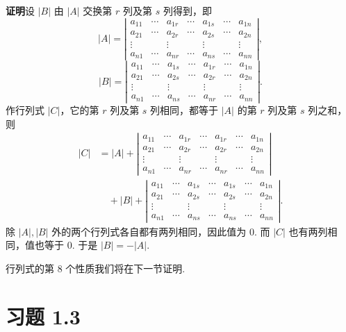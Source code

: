 \documentclass[UTF8,12pt,a4paper,fontset=fandol]{ctexart}
\begin{document}
\noindent\textbf{证明}\quad 设 $|B|$ 由 $|A|$ 交换第 $r$ 列及第 $s$ 列得到，即
\[
|A|=
\left|\begin{array}{ccccccc}
a_{11} & \cdots & a_{1r} & \cdots & a_{1s} & \cdots & a_{1n}\\
a_{21} & \cdots & a_{2r} & \cdots & a_{2s} & \cdots & a_{2n}\\
\vdots & & \vdots & & \vdots & & \vdots\\
a_{n1} & \cdots & a_{nr} & \cdots & a_{ns} & \cdots & a_{nn}
\end{array}\right|,
\]
\[
|B|=
\left|\begin{array}{ccccccc}
a_{11} & \cdots & a_{1s} & \cdots & a_{1r} & \cdots & a_{1n}\\
a_{21} & \cdots & a_{2s} & \cdots & a_{2r} & \cdots & a_{2n}\\
\vdots & & \vdots & & \vdots & & \vdots\\
a_{n1} & \cdots & a_{ns} & \cdots & a_{nr} & \cdots & a_{nn}
\end{array}\right|.
\]
作行列式 $|C|$，它的第 $r$ 列及第 $s$ 列相同，都等于 $|A|$ 的第 $r$ 列及第 $s$ 列之和，则
\[
\begin{aligned}
|C|
&=|A|+
\left|\begin{array}{ccccccc}
a_{11} & \cdots & a_{1r} & \cdots & a_{1r} & \cdots & a_{1n}\\
a_{21} & \cdots & a_{2r} & \cdots & a_{2r} & \cdots & a_{2n}\\
\vdots & & \vdots & & \vdots & & \vdots\\
a_{n1} & \cdots & a_{nr} & \cdots & a_{nr} & \cdots & a_{nn}
\end{array}\right|\\
&\quad+|B|+
\left|\begin{array}{ccccccc}
a_{11} & \cdots & a_{1s} & \cdots & a_{1s} & \cdots & a_{1n}\\
a_{21} & \cdots & a_{2s} & \cdots & a_{2s} & \cdots & a_{2n}\\
\vdots & & \vdots & & \vdots & & \vdots\\
a_{n1} & \cdots & a_{ns} & \cdots & a_{ns} & \cdots & a_{nn}
\end{array}\right|.
\end{aligned}
\]
除 $|A|,|B|$ 外的两个行列式各自都有两列相同，因此值为 0. 而 $|C|$ 也有两列相同，值也等于 0. 于是 $|B|=-|A|$.

行列式的第 8 个性质我们将在下一节证明.

\section*{习题 1.3}
\end{document}
